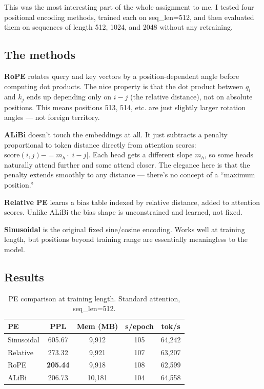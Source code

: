 \documentclass[12pt,a4paper]{article}
\begin{document}
This was the most interesting part of the whole assignment to me. I tested four positional encoding methods, trained each on seq\_len=512, and then evaluated them on sequences of length 512, 1024, and 2048 without any retraining.

\subsection{The methods}

\textbf{RoPE} \cite{su2024roformer} rotates query and key vectors by a position-dependent angle before computing dot products. The nice property is that the dot product between $q_i$ and $k_j$ ends up depending only on $i-j$ (the relative distance), not on absolute positions. This means positions 513, 514, etc. are just slightly larger rotation angles — not foreign territory.

\textbf{ALiBi} \cite{press2022train} doesn't touch the embeddings at all. It just subtracts a penalty proportional to token distance directly from attention scores: $\text{score}(i,j) -= m_h \cdot |i-j|$. Each head gets a different slope $m_h$, so some heads naturally attend further and some attend closer. The elegance here is that the penalty extends smoothly to any distance — there's no concept of a ``maximum position.''

\textbf{Relative PE} learns a bias table indexed by relative distance, added to attention scores. Unlike ALiBi the bias shape is unconstrained and learned, not fixed.

\textbf{Sinusoidal} is the original fixed sine/cosine encoding. Works well at training length, but positions beyond training range are essentially meaningless to the model.

\subsection{Results}

\begin{table}[H]
\centering
\caption{PE comparison at training length. Standard attention, seq\_len=512.}
\begin{tabular}{lcccc}
\toprule
\textbf{PE} & \textbf{PPL} & \textbf{Mem (MB)} & \textbf{s/epoch} & \textbf{tok/s} \\
\midrule
Sinusoidal & 605.67 & 9,912 & 105 & 64,242 \\
Relative   & 273.32 & 9,921 & 107 & 63,207 \\
RoPE       & \textbf{205.44} & 9,918 & 108 & 62,599 \\
ALiBi      & 206.73 & 10,181 & 104 & 64,558 \\
\bottomrule
\end{tabular}
\end{table}
\end{document}
